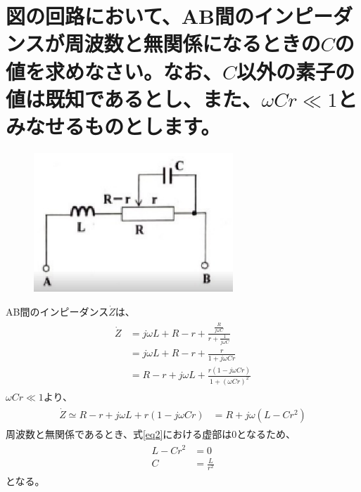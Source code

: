 \documentclass[a4paper,11pt]{jsarticle}
\begin{document}
\title{}
\author{}
\date{\today}


\section{図の回路において、AB間のインピーダンスが周波数と無関係になるときの$C$の値を求めなさい。なお、$C$以外の素子の値は既知であるとし、また、$\omega Cr \ll 1$とみなせるものとします。}
\begin{figure}[htbp]
  \centering
  \includegraphics[width=7.5cm]{fig4.eps}
  \caption{}\label{fig1}
\end{figure}

AB間のインピーダンス$\dot{Z}$は、
\begin{align}
  \begin{split}
    \dot{Z}
    &=j\omega L +R-r+\frac{\frac{R}{j\omega C}}{r+\frac{1}{j\omega C}}\\
    &=j\omega L +R-r+\frac{r}{1+j\omega Cr}\\
    &=R-r+j\omega L+\frac{r(1-j\omega Cr)}{1+{(\omega Cr)}^{2}}
    \label{eq1}
  \end{split}
\end{align}
$\omega Cr \ll 1$より、
\begin{align}
  \begin{split}
    \dot{Z}\simeq R-r+j\omega L+r(1-j\omega Cr)
    &=R+j\omega (L-Cr^{2})
    \label{eq2}
  \end{split}
\end{align}
周波数と無関係であるとき、式\eqref{eq2}における虚部は0となるため、
\begin{align}
  \begin{split}
    L-Cr^{2}
    &=0\\
    C
    &=\frac{L}{r^{2}}
    \label{eq3}
  \end{split}
\end{align}
となる。
\end{document}
